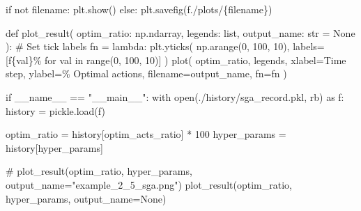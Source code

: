 \documentclass[
  letterpaper,
]{krantz}
\makeatletter
\newenvironment{Shaded}{\begin{snugshade}}{\end{snugshade}}
\newcommand{\BuiltInTok}[1]{\textcolor[rgb]{0.00,0.23,0.31}{#1}}
\newcommand{\CommentTok}[1]{\textcolor[rgb]{0.37,0.37,0.37}{#1}}
\newcommand{\ControlFlowTok}[1]{\textcolor[rgb]{0.00,0.23,0.31}{#1}}
\newcommand{\DecValTok}[1]{\textcolor[rgb]{0.68,0.00,0.00}{#1}}
\newcommand{\ImportTok}[1]{\textcolor[rgb]{0.00,0.46,0.62}{#1}}
\newcommand{\KeywordTok}[1]{\textcolor[rgb]{0.00,0.23,0.31}{#1}}
\newcommand{\NormalTok}[1]{\textcolor[rgb]{0.00,0.23,0.31}{#1}}
\newcommand{\OperatorTok}[1]{\textcolor[rgb]{0.37,0.37,0.37}{#1}}
\newcommand{\SpecialCharTok}[1]{\textcolor[rgb]{0.37,0.37,0.37}{#1}}
\newcommand{\SpecialStringTok}[1]{\textcolor[rgb]{0.13,0.47,0.30}{#1}}
\newcommand{\StringTok}[1]{\textcolor[rgb]{0.13,0.47,0.30}{#1}}
\newcommand{\VariableTok}[1]{\textcolor[rgb]{0.07,0.07,0.07}{#1}}
\newenvironment{kframe}{%
\medskip{}
\setlength{\fboxsep}{.8em}
 \def\at@end@of@kframe{}%
 \ifinner\ifhmode%
  \def\at@end@of@kframe{\end{minipage}}%
  \begin{minipage}{\columnwidth}%
 \fi\fi%
 \def\FrameCommand##1{\hskip\@totalleftmargin \hskip-\fboxsep
 \colorbox{shadecolor}{##1}\hskip-\fboxsep
     \hskip-\linewidth \hskip-\@totalleftmargin \hskip\columnwidth}%
 \MakeFramed {\advance\hsize-\width
   \@totalleftmargin\z@ \linewidth\hsize
   \@setminipage}}%
 {\par\unskip\endMakeFramed%
 \at@end@of@kframe}
\renewenvironment{Shaded}{\begin{kframe}}{\end{kframe}}
\theoremstyle{plain}
\theoremstyle{definition}
\theoremstyle{definition}
\theoremstyle{remark}
\makeatother
\begin{document}
\begin{codelisting}
\begin{Shaded}
\begin{Highlighting}[]
    \ControlFlowTok{if} \KeywordTok{not}\NormalTok{ filename:}
\NormalTok{        plt.show()}
    \ControlFlowTok{else}\NormalTok{:}
\NormalTok{        plt.savefig(}\SpecialStringTok{f\textquotesingle{}./plots/}\SpecialCharTok{\{}\NormalTok{filename}\SpecialCharTok{\}}\SpecialStringTok{\textquotesingle{}}\NormalTok{)}


\KeywordTok{def}\NormalTok{ plot\_result(}
\NormalTok{        optim\_ratio: np.ndarray,}
\NormalTok{        legends: }\BuiltInTok{list}\NormalTok{,}
\NormalTok{        output\_name: }\BuiltInTok{str} \OperatorTok{=} \VariableTok{None}
\NormalTok{        ):}
    \CommentTok{\# Set tick labels}
\NormalTok{    fn }\OperatorTok{=} \KeywordTok{lambda}\NormalTok{: plt.yticks(}
\NormalTok{        np.arange(}\DecValTok{0}\NormalTok{, }\DecValTok{100}\NormalTok{, }\DecValTok{10}\NormalTok{), labels}\OperatorTok{=}\NormalTok{[}\SpecialStringTok{f\textquotesingle{}}\SpecialCharTok{\{}\NormalTok{val}\SpecialCharTok{\}}\SpecialStringTok{\%\textquotesingle{}} \ControlFlowTok{for}\NormalTok{ val }\KeywordTok{in} \BuiltInTok{range}\NormalTok{(}\DecValTok{0}\NormalTok{, }\DecValTok{100}\NormalTok{, }\DecValTok{10}\NormalTok{)]}
\NormalTok{        )}
\NormalTok{    plot(}
\NormalTok{        optim\_ratio,}
\NormalTok{        legends,}
\NormalTok{        xlabel}\OperatorTok{=}\StringTok{\textquotesingle{}Time step\textquotesingle{}}\NormalTok{,}
\NormalTok{        ylabel}\OperatorTok{=}\StringTok{\textquotesingle{}\% Optimal actions\textquotesingle{}}\NormalTok{,}
\NormalTok{        filename}\OperatorTok{=}\NormalTok{output\_name,}
\NormalTok{        fn}\OperatorTok{=}\NormalTok{fn}
\NormalTok{        )}


\ControlFlowTok{if} \VariableTok{\_\_name\_\_} \OperatorTok{==} \StringTok{"\_\_main\_\_"}\NormalTok{:}
    \ControlFlowTok{with} \BuiltInTok{open}\NormalTok{(}\StringTok{\textquotesingle{}./history/sga\_record.pkl\textquotesingle{}}\NormalTok{, }\StringTok{\textquotesingle{}rb\textquotesingle{}}\NormalTok{) }\ImportTok{as}\NormalTok{ f:}
\NormalTok{        history }\OperatorTok{=}\NormalTok{ pickle.load(f)}
    
\NormalTok{    optim\_ratio }\OperatorTok{=}\NormalTok{ history[}\StringTok{\textquotesingle{}optim\_acts\_ratio\textquotesingle{}}\NormalTok{] }\OperatorTok{*} \DecValTok{100}
\NormalTok{    hyper\_params }\OperatorTok{=}\NormalTok{ history[}\StringTok{\textquotesingle{}hyper\_params\textquotesingle{}}\NormalTok{]}
    
    \CommentTok{\# plot\_result(optim\_ratio, hyper\_params, output\_name="example\_2\_5\_sga.png")}
\NormalTok{    plot\_result(optim\_ratio, hyper\_params, output\_name}\OperatorTok{=}\VariableTok{None}\NormalTok{)}
    
\end{Highlighting}
\end{Shaded}

\end{codelisting}
\end{document}
